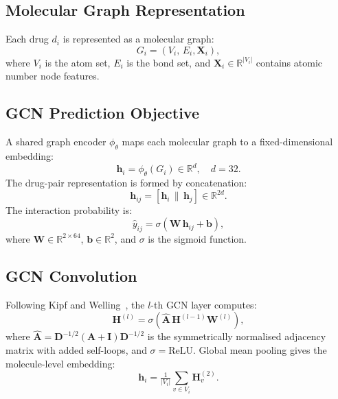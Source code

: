 \documentclass[conference]{IEEEtran}
\begin{document}
\subsection{Molecular Graph Representation}

Each drug $d_i$ is represented as a molecular graph:
\begin{equation}
  G_i = (V_i,\, E_i, \mathbf{X}_i),
  \label{eq:graph}
\end{equation}
where $V_i$ is the atom set, $E_i$ is the bond set, and $\mathbf{X}_i \in \mathbb{R}^{|V_i|}$
contains atomic number node features.

\subsection{GCN Prediction Objective}

A shared graph encoder $\phi_\theta$ maps each molecular graph to a fixed-dimensional
embedding:
\begin{equation}
  \mathbf{h}_i = \phi_\theta(G_i) \in \mathbb{R}^d, \quad d=32.
  \label{eq:embed}
\end{equation}
The drug-pair representation is formed by concatenation:
\begin{equation}
  \mathbf{h}_{ij} = [\mathbf{h}_i \,\|\, \mathbf{h}_j] \in \mathbb{R}^{2d}.
  \label{eq:pair}
\end{equation}
The interaction probability is:
\begin{equation}
  \hat{y}_{ij} = \sigma\!\left(\mathbf{W}\,\mathbf{h}_{ij} + \mathbf{b}\right),
  \label{eq:pred}
\end{equation}
where $\mathbf{W} \in \mathbb{R}^{2\times 64}$, $\mathbf{b} \in \mathbb{R}^2$, and
$\sigma$ is the sigmoid function.

\subsection{GCN Convolution}

Following Kipf and Welling~\cite{kipf2016semi}, the $l$-th GCN layer computes:
\begin{equation}
  \mathbf{H}^{(l)} = \sigma\!\left(\hat{\mathbf{A}}\,\mathbf{H}^{(l-1)}\mathbf{W}^{(l)}\right),
  \label{eq:gcnlayer}
\end{equation}
where $\hat{\mathbf{A}} = \mathbf{D}^{-1/2}(\mathbf{A}+\mathbf{I})\mathbf{D}^{-1/2}$ is
the symmetrically normalised adjacency matrix with added self-loops, and $\sigma = \mathrm{ReLU}$.
Global mean pooling gives the molecule-level embedding:
\begin{equation}
  \mathbf{h}_i = \tfrac{1}{|V_i|}\textstyle\sum_{v\in V_i}\mathbf{H}^{(2)}_v.
  \label{eq:pool}
\end{equation}
\end{document}
